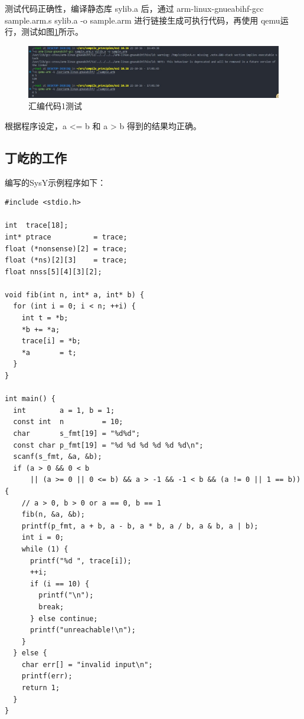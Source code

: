\documentclass[UTF8,a4paper,10pt]{ctexart}
\begin{document}
测试代码正确性，编译静态库 sylib.a 后，通过 arm-linux-gnueabihf-gcc sample.arm.s sylib.a -o sample.arm 进行链接生成可执行代码，再使用 qemu运行，测试如图\ref{fig:1}所示。

\begin{figure}[H]
  \centering
  \includegraphics[width=1\textwidth]{figure/1.jpg}
  \caption{汇编代码1测试}
  \label{fig:1}
\end{figure}

根据程序设定，a <= b 和 a > b 得到的结果均正确。

\subsection{丁屹的工作}

编写的SysY示例程序如下：
\begin{verbatim}
#include <stdio.h>

int  trace[18];
int* ptrace          = trace;
float (*nonsense)[2] = trace;
float (*ns)[2][3]    = trace;
float nnss[5][4][3][2];

void fib(int n, int* a, int* b) {
  for (int i = 0; i < n; ++i) {
    int t = *b;
    *b += *a;
    trace[i] = *b;
    *a       = t;
  }
}

int main() {
  int        a = 1, b = 1;
  const int  n         = 10;
  char       s_fmt[19] = "%d%d";
  const char p_fmt[19] = "%d %d %d %d %d %d\n";
  scanf(s_fmt, &a, &b);
  if (a > 0 && 0 < b
      || (a >= 0 || 0 <= b) && a > -1 && -1 < b && (a != 0 || 1 == b)) {
    // a > 0, b > 0 or a == 0, b == 1
    fib(n, &a, &b);
    printf(p_fmt, a + b, a - b, a * b, a / b, a & b, a | b);
    int i = 0;
    while (1) {
      printf("%d ", trace[i]);
      ++i;
      if (i == 10) {
        printf("\n");
        break;
      } else continue;
      printf("unreachable!\n");
    }
  } else {
    char err[] = "invalid input\n";
    printf(err);
    return 1;
  }
}
\end{verbatim}
\end{document}
